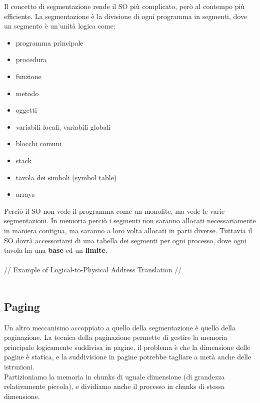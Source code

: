 \documentclass[12pt, a4paper]{article}
\begin{document}
	Il concetto di segmentazione rende il SO più complicato, però al contempo più efficiente. La segmentazione è la divisione di ogni programma in segmenti, dove un segmento è un'unità logica come:
	\begin{itemize}
		\item programma principale
		\item procedura
		\item funzione
		\item metodo
		\item oggetti
		\item variabili locali, variabili globali
		\item blocchi comuni
		\item stack
		\item tavola dei simboli (symbol table)
		\item arrays
	\end{itemize}
	Perciò il SO non vede il programma come un monolite, ma vede le varie segmentazioni. In memoria perciò i segmenti non saranno allocati necessariamente in maniera contigua, ma saranno a loro volta allocati in parti diverse. Tuttavia il SO dovrà accessoriarsi di una tabella dei segmenti per ogni processo, dove ogni tavola ha una \textbf{base} ed un \textbf{limite}. \\\\
	// Example of Logical-to-Physical Address Translation // \\ \\
	
	
	\subsection*{Paging}
	
	Un altro meccanismo accoppiato a quello della segmentazione è quello della paginazione. La tecnica della paginazione permette di gestire la memoria principale logicamente suddivisa in pagine, il problema è che la dimensione delle pagine è statica, e la suddivisione in pagine potrebbe tagliare a metà anche delle istruzioni. \\
	Partizioniamo la memoria in chunks di uguale dimensione (di grandezza relativamente piccola), e dividiamo anche il processo in chunks di stessa dimensione.
	
	
\end{document}

